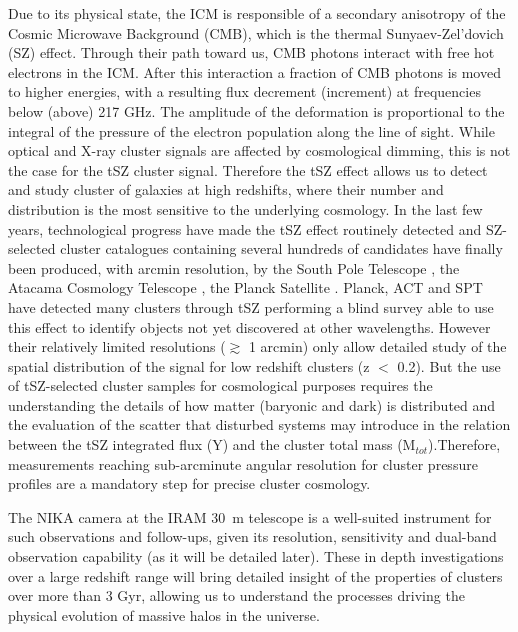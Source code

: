 \documentclass[11pt,a4paper,twoside,graphicx,color]{article}
\begin{document}
Due to its physical state, the ICM is responsible of a secondary anisotropy of the Cosmic Microwave Background (CMB), which is the thermal Sunyaev-Zel'dovich (SZ) effect. Through their path toward us, CMB photons interact with free hot electrons in the ICM. After this interaction a fraction of CMB photons is moved to higher energies, with a resulting flux decrement (increment) at frequencies below (above) 217 GHz. The amplitude of the deformation is proportional to the integral of the pressure of the electron population along the line of sight. While optical and X-ray cluster signals are affected by cosmological dimming, this is not the case for the tSZ cluster signal. Therefore the tSZ effect allows us to detect and study cluster of galaxies at high redshifts, where their number and distribution is the most sensitive to the underlying cosmology.
In the last few years, technological progress have made the tSZ effect routinely detected and SZ-selected cluster catalogues containing several hundreds of candidates have finally been produced, with arcmin resolution, by the South Pole Telescope \citep[SPT, FWHM $\sim$ 1.1 arcmin at 150 GHz,][]{Reichardt2013, Bleem2014}, the Atacama Cosmology Telescope \citep[ACT, FWHM $\sim$ 1.4 arcmin at 148 GHz, ][]{Hasselfield2013}, the Planck Satellite \citep[FWHM $\sim$ 10 arcmin for SZ,][]{PSZ1, PSZ2}.  Planck, ACT and SPT have detected many clusters through tSZ performing a blind survey able to use this effect to identify objects not yet discovered at other wavelengths. However their relatively limited resolutions ($\gtrsim$ 1 arcmin) only allow detailed study of the spatial distribution of the signal for low redshift clusters (z $<$ 0.2). But the use of tSZ-selected cluster samples for cosmological purposes requires the understanding the details of how matter (baryonic and dark) is distributed and the evaluation of the scatter that disturbed systems may introduce in the relation between the tSZ integrated flux (Y) and the cluster total mass (M$_{tot}$).Therefore, measurements reaching sub-arcminute angular resolution for cluster pressure profiles are a mandatory step for precise cluster cosmology. 

The NIKA camera at the IRAM 30~m telescope is a well-suited instrument for such observations and follow-ups, given its resolution, sensitivity and dual-band observation capability (as it will be detailed later). These in depth investigations over a large redshift range will bring detailed insight of the properties of clusters over more than 3 Gyr, allowing us to understand the processes driving the physical evolution of massive halos in the universe.
\end{document}
